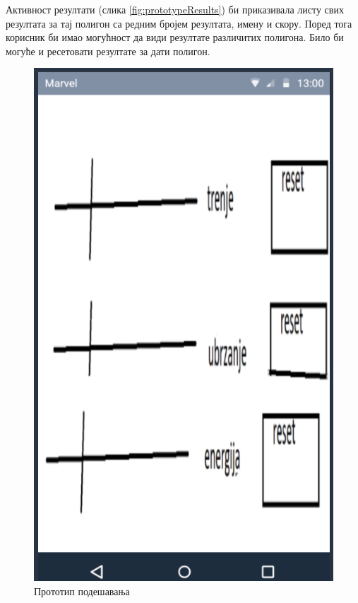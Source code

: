 Активност резултати (слика \ref{fig:prototypeResults}) би приказивала листу свих резултата за тај полигон са редним бројем резултата, имену и скору. Поред тога корисник би имао могућност да види резултате различитих полигона. Било би могуће и ресетовати резултате за дати полигон.

\begin{figure}[htb!]
\begin{center}
\includegraphics[scale=.5]{pictures/prototype/settingsActivity}
\caption{Прототип подешавања}\label{fig:prototypeSettings}
\end{center}
\end{figure}

